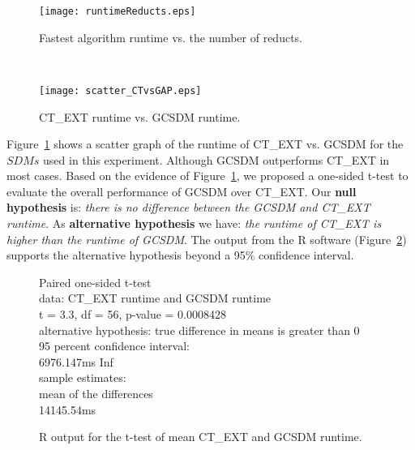 \documentclass[authoryear,11pt]{elsarticle}
\begin{document}
	\begin{figure}[htb]
	\begin{minipage}{.48\textwidth}
	    \begin{center}
	       \texttt{[image: runtimeReducts.eps]}
	    \end{center}
	\caption{Fastest algorithm runtime vs. the number of reducts.}
	\label{fig:TimeReducts}
	\end{minipage}%
	~
	\begin{minipage}{.48\textwidth}
	    \begin{center}
	       \texttt{[image: scatter\_CTvsGAP.eps]}
	    \end{center}
	\caption{CT\_EXT runtime vs. GCSDM runtime.}
	\label{fig:CTvsGAP}
	\end{minipage}	
	\end{figure}		
	
	Figure~\ref{fig:CTvsGAP} shows a scatter graph of the runtime of CT\_EXT vs. GCSDM for the $SDMs$ used in
	this experiment. Although GCSDM outperforms CT\_EXT in most cases. Based on the evidence of
	Figure~\ref{fig:CTvsGAP}, we proposed a one-sided t-test to evaluate the overall performance of GCSDM over
	CT\_EXT. Our \textbf{null hypothesis} is: \emph{there is no difference between the GCSDM and CT\_EXT runtime}.
	As \textbf{alternative hypothesis} we have: \emph{the runtime of CT\_EXT is higher than the runtime of GCSDM}.
	The output from the R software (Figure~\ref{fig:R_GCSDM}) supports the alternative hypothesis beyond a 95\%
	confidence interval. 
	
	\begin{figure}
		\qquad{}	Paired one-sided t-test\\

		data:  CT\_EXT runtime and GCSDM runtime\\
		t = 3.3, df = 56, p-value = 0.0008428\\
		alternative hypothesis: true difference in means is greater than 0\\
		95 percent confidence interval:\\
		 6976.147ms  \qquad{}  Inf\\
		sample estimates:\\
		mean of the differences \\
		 \qquad{}    14145.54ms
		 
		\centering
	  	\caption{R output for the t-test of mean CT\_EXT and GCSDM runtime.}
	  	\label{fig:R_GCSDM}
	\end{figure}
	
\end{document}
